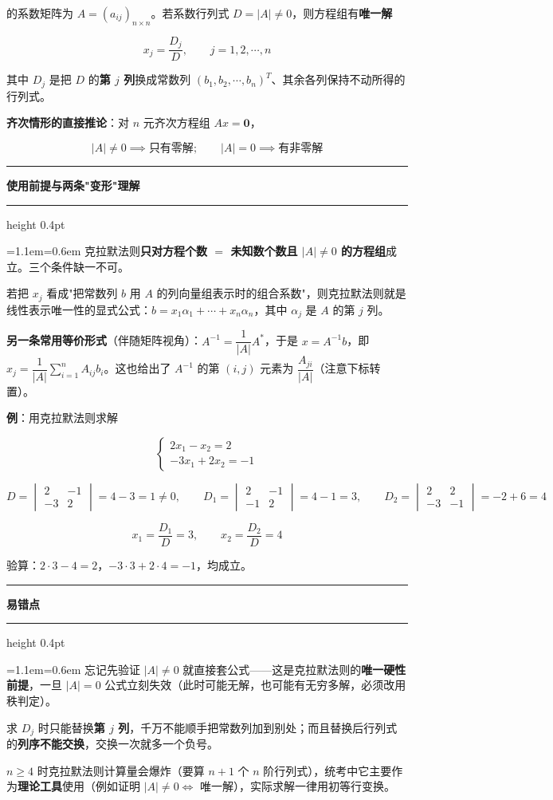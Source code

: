 \documentclass[11pt,openany,UTF8]{ctexbook}
\newcommand{\callouthead}[2]{%
  \par\addvspace{7pt}\noindent
  {\color{#1}\rule[-0.15em]{3pt}{1.05em}}\hspace{0.5em}%
  {\bfseries\color{#1}#2}\par\nobreak\vspace{-0.35em}%
  {\color{rulesep}\hrule height 0.4pt}\nobreak\vspace{0.45em}%
  \begingroup\small\setlength{\parindent}{0pt}%
  \leftskip=1.1em\rightskip=0.6em\noindent\ignorespaces}
\newcommand{\calloutend}{\par\endgroup\addvspace{7pt}}
\newenvironment{callkey}[1]{\callouthead{keybar}{#1}}{\calloutend}
\newenvironment{callwarn}[1]{\callouthead{warnbar}{#1}}{\calloutend}
\begin{document}
的系数矩阵为 $A=(a_{ij})_{n\times n}$。若系数行列式 $D=\vert A\vert\ne 0$，则方程组有\textbf{唯一解}

\[x_j=\frac{D_j}{D},\qquad j=1,2,\cdots,n\]

其中 $D_j$ 是把 $D$ 的\textbf{第 $j$ 列}换成常数列 $(b_1,b_2,\cdots,b_n)^T$、其余各列保持不动所得的行列式。

\textbf{齐次情形的直接推论}：对 $n$ 元齐次方程组 $Ax=\mathbf{0}$，

\[\vert A\vert\ne 0\implies \text{只有零解};\qquad \vert A\vert=0\implies \text{有非零解}\]

\begin{callkey}{使用前提与两条"变形"理解}
克拉默法则\textbf{只对方程个数 $=$ 未知数个数且 $\vert A\vert\ne 0$ 的方程组}成立。三个条件缺一不可。

若把 $x_j$ 看成"把常数列 $b$ 用 $A$ 的列向量组表示时的组合系数"，则克拉默法则就是线性表示唯一性的显式公式：$b=x_1\alpha_1+\cdots+x_n\alpha_n$，其中 $\alpha_j$ 是 $A$ 的第 $j$ 列。

\textbf{另一条常用等价形式}（伴随矩阵视角）：$A^{-1}=\dfrac{1}{\vert A\vert}A^*$，于是 $x=A^{-1}b$，即 $x_j=\dfrac{1}{\vert A\vert}\sum_{i=1}^{n}A_{ij}b_i$。这也给出了 $A^{-1}$ 的第 $(i,j)$ 元素为 $\dfrac{A_{ji}}{\vert A\vert}$（注意下标转置）。

\end{callkey}

\textbf{例}：用克拉默法则求解

\[\begin{cases} 2x_1-x_2=2 \\ -3x_1+2x_2=-1 \end{cases}\]

\[D=\begin{vmatrix} 2 & -1 \\ -3 & 2 \end{vmatrix}=4-3=1\ne 0,\qquad
D_1=\begin{vmatrix} 2 & -1 \\ -1 & 2 \end{vmatrix}=4-1=3,\qquad
D_2=\begin{vmatrix} 2 & 2 \\ -3 & -1 \end{vmatrix}=-2+6=4\]

\[x_1=\frac{D_1}{D}=3,\qquad x_2=\frac{D_2}{D}=4\]

验算：$2\cdot3-4=2$，$-3\cdot3+2\cdot4=-1$，均成立。

\begin{callwarn}{易错点}
忘记先验证 $\vert A\vert\ne 0$ 就直接套公式——这是克拉默法则的\textbf{唯一硬性前提}，一旦 $\vert A\vert=0$ 公式立刻失效（此时可能无解，也可能有无穷多解，必须改用秩判定）。

求 $D_j$ 时只能替换\textbf{第 $j$ 列}，千万不能顺手把常数列加到别处；而且替换后行列式的\textbf{列序不能交换}，交换一次就多一个负号。

$n\ge 4$ 时克拉默法则计算量会爆炸（要算 $n+1$ 个 $n$ 阶行列式），统考中它主要作为\textbf{理论工具}使用（例如证明 $\vert A\vert\ne 0\iff$ 唯一解），实际求解一律用初等行变换。

\end{callwarn}
\end{document}
